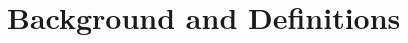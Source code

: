 \documentclass{article}
\begin{document}

















\section{Background and Definitions}
\end{document}
